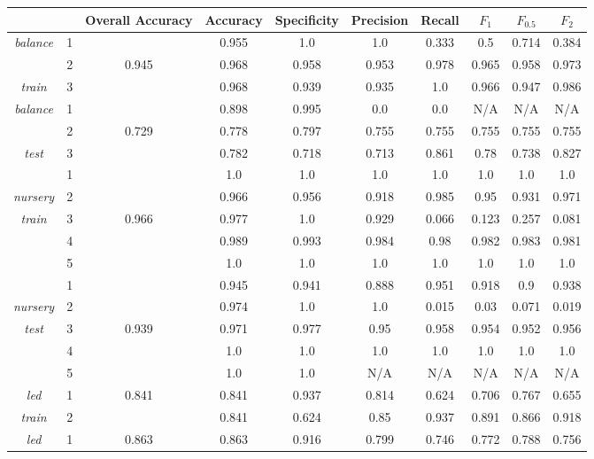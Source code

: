 \documentclass[11pt]{article}
\begin{document}
    \begin{center}
    \begin{longtable}{| c | c | c | c | c | c | c | c | c | c |}
    		\hline
    		 & & Overall Accuracy & Accuracy & Specificity & Precision & Recall & $F_1$ & $F_{0.5}$ & $F_2$\\
    		 \hline
    		 \textit{balance} & 1 &  & 0.955 & 1.0 & 1.0& 0.333& 0.5& 0.714& 0.384\\
    		                  & 2 & 0.945 & 0.968 & 0.958 & 0.953& 0.978& 0.965& 0.958& 0.973\\
    		 \textit{train}	  & 3 &  & 0.968 & 0.939 & 0.935& 1.0& 0.966& 0.947& 0.986\\
    		 \hline
    		 \textit{balance} & 1 &  & 0.898 & 0.995 & 0.0& 0.0& N/A& N/A& N/A\\
    		                  & 2 & 0.729 & 0.778 & 0.797 & 0.755& 0.755& 0.755& 0.755& 0.755\\
    		 \textit{test}	  & 3 &  & 0.782 & 0.718 & 0.713& 0.861& 0.78& 0.738& 0.827\\
    		 \hline
    		                  & 1 & & 1.0 & 1.0 & 1.0& 1.0& 1.0& 1.0& 1.0\\
    		 \textit{nursery} & 2 & & 0.966 & 0.956 & 0.918& 0.985& 0.95& 0.931& 0.971\\
    		 \textit{train}	  & 3 & 0.966 & 0.977 & 1.0 & 0.929& 0.066& 0.123& 0.257& 0.081\\
    		                  & 4 & & 0.989 & 0.993 & 0.984& 0.98& 0.982& 0.983& 0.981\\
    		                  & 5 & & 1.0 & 1.0 & 1.0& 1.0& 1.0& 1.0& 1.0\\
    		 \hline
    		 				  & 1 & & 0.945 & 0.941 & 0.888& 0.951& 0.918& 0.9& 0.938\\
    		 \textit{nursery} & 2 & & 0.974 & 1.0 & 1.0& 0.015& 0.03& 0.071& 0.019\\
    		 \textit{test}	  & 3 & 0.939 & 0.971 & 0.977 & 0.95& 0.958& 0.954& 0.952& 0.956\\
    		                  & 4 & & 1.0 & 1.0 & 1.0& 1.0& 1.0& 1.0& 1.0\\
    		                  & 5 & & 1.0 & 1.0 & N/A& N/A& N/A& N/A& N/A\\
    		 \hline
    		 \textit{led}     & 1 & 0.841 & 0.841 & 0.937 & 0.814& 0.624& 0.706& 0.767& 0.655\\
    		 \textit{train}	  & 2 & & 0.841 & 0.624 & 0.85& 0.937& 0.891& 0.866& 0.918\\
    		 \hline
    		 \textit{led}     & 1 & 0.863&0.863 & 0.916 & 0.799& 0.746& 0.772& 0.788& 0.756\\

\end{longtable}
\end{center}
\end{document}
